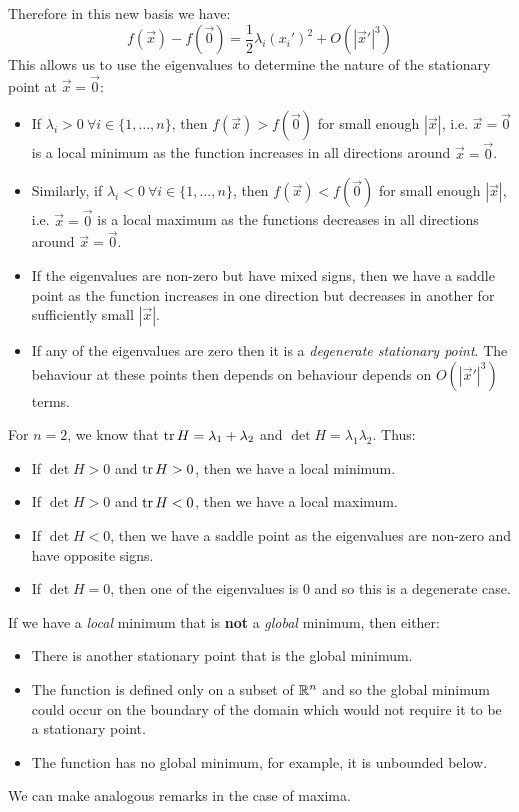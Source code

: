 \documentclass[../main.tex]{subfiles}
\begin{document}
Therefore in this new basis we have:
\[
  f(\vec{x}) - f(\vec{0}) = \frac{1}{2}\lambda_i (x_i')^2 + O(|\vec{x}'|^3)
\]
This allows us to use the eigenvalues to determine the nature of the stationary point at $\vec{x} = \vec{0}$:
\begin{itemize}
  \item If $\lambda_i > 0\ \forall i \in \{1, \ldots, n\}$, then $f(\vec{x}) > f(\vec{0})$ for small enough $|\vec{x}|$, i.e. $\vec{x} = \vec{0}$ is a local minimum as the function increases in all directions around $\vec{x} = \vec{0}$.
  \item Similarly, if $\lambda_i < 0\ \forall i \in \{1, \ldots, n\}$, then $f(\vec{x}) < f(\vec{0})$ for small enough $|\vec{x}|$, i.e. $\vec{x} = \vec{0}$ is a local maximum as the functions decreases in all directions around $\vec{x} = \vec{0}$.
  \item If the eigenvalues are non-zero but have mixed signs, then we have a saddle point as the function increases in one direction but decreases in another for sufficiently small $|\vec{x}|$.
  \item If any of the eigenvalues are zero then it is a \textit{degenerate stationary point}.
    The behaviour at these points then depends on behaviour depends on $O(|\vec{x}'|^3)$ terms.
\end{itemize}
\begin{remark}[In 2D]
  For $n = 2$, we know that $\operatorname{tr} H = \lambda_1 + \lambda_2$ and $\det H = \lambda_1 \lambda_2$.
  Thus:
  \begin{itemize}
    \item If $\det H > 0$ and $\operatorname{tr} H > 0$, then we have a local minimum.
    \item If $\det H > 0$ and $\operatorname{tr} H < 0$, then we have a local maximum.
    \item If $\det H < 0$, then we have a saddle point as the eigenvalues are non-zero and have opposite signs.
    \item If $\det H = 0$, then one of the eigenvalues is $0$ and so this is a degenerate case.
  \end{itemize}
\end{remark}
\begin{remark}
  If we have a \textit{local} minimum that is \textbf{not} a \textit{global} minimum, then either:
  \begin{itemize}
    \item There is another stationary point that is the global minimum.
    \item The function is defined only on a subset of $\mathbb{R}^{n}$ and so the global minimum could occur on the boundary of the domain which would not require it to be a stationary point.
    \item The function has no global minimum, for example, it is unbounded below.
  \end{itemize}
  We can make analogous remarks in the case of maxima.
\end{remark}
\end{document}
